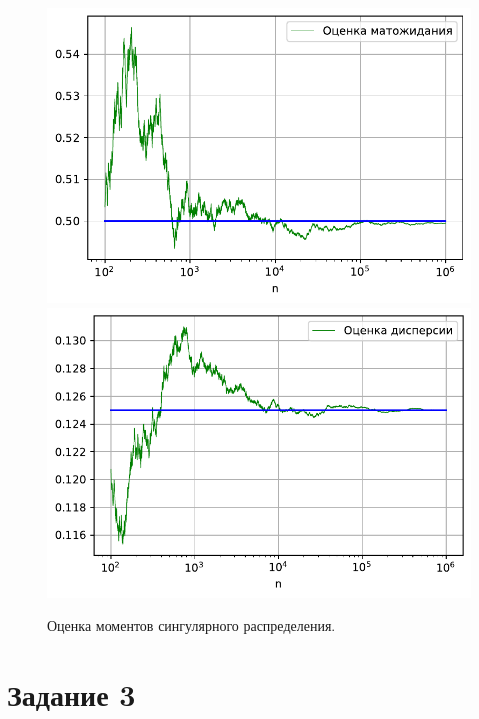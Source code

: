 \documentclass[16pt]{article}
\begin{document}
\begin{figure}[h]
	\center
    \includegraphics[scale=0.5]{2_2.pdf}
    \hfill
    \includegraphics[scale=0.5]{2_3.pdf}
    \caption{Оценка моментов сингулярного распределения.}
\end{figure}

\newpage
\section{Задание 3}
\end{document}
